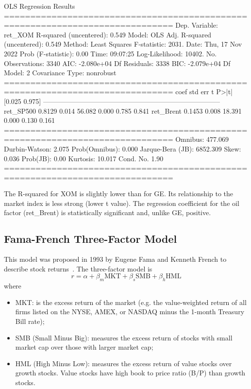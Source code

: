 \begin{ioutput}
OLS Regression Results
==============================================================================
Dep. Variable:                ret_XOM   R-squared (uncentered):          0.549
Model:                            OLS   Adj. R-squared (uncentered):     0.549
Method:                 Least Squares   F-statistic:                     2031.
Date:                Thu, 17 Nov 2022   Prob (F-statistic):               0.00
Time:                        09:07:25   Log-Likelihood:                 10402.
No. Observations:                3340   AIC:                        -2.080e+04
Df Residuals:                    3338   BIC:                        -2.079e+04
Df Model:                           2
Covariance Type:            nonrobust
==============================================================================
coef          std err          t      P>|t|      [0.025      0.975]
------------------------------------------------------------------------------
ret_SP500      0.8129      0.014     56.082      0.000       0.785       0.841
ret_Brent      0.1453      0.008     18.391      0.000       0.130       0.161
==============================================================================
Omnibus:                      477.069   Durbin-Watson:                   2.075
Prob(Omnibus):                  0.000   Jarque-Bera (JB):             6852.309
Skew:                           0.036   Prob(JB):                         0.00
Kurtosis:                      10.017   Cond. No.                         1.90
==============================================================================
\end{ioutput}

The R-squared for XOM is slightly lower than for GE. Its relationship to the market index is less strong (lower t value).
The regression coefficient for the oil factor (ret\_Brent) is statistically significant and, unlike GE, positive.

\subsection{Fama-French Three-Factor Model}
This model was proposed in 1993 by Eugene Fama and Kenneth French to describe stock returns~\cite{bib:fama_french}. The three-factor model is
\begin{equation}
r=\alpha + \beta_m \textrm{MKT} +\beta_s \textrm{SMB}+ \beta_h \textrm{HML}
\end{equation}
where
\begin{itemize}
\tightlist
\item MKT: is the excess return of the market (e.g. the value-weighted return of all firms listed on the NYSE, AMEX, or NASDAQ minus the 1-month Treasury Bill rate);
\item SMB (Small Minus Big): measures the excess return of stocks with small market cap over those with larger market cap;
\item HML (High Minus Low): measures the excess return of value stocks over growth stocks. Value stocks have high book to price ratio (B/P) than growth stocks.
\end{itemize}

